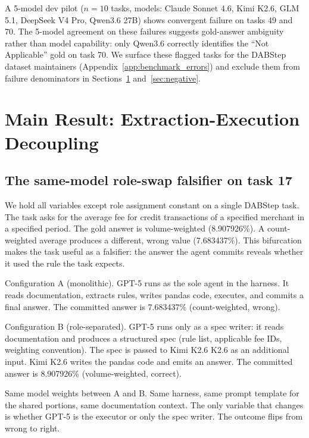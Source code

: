 \documentclass[conference]{IEEEtran}
\newcommand{\Kimi}{Kimi K2.6}
\newcommand{\DeepSeek}{DeepSeek V4 Pro}
\newcommand{\Sonnet}{Claude Sonnet 4.6}
\begin{document}
A 5-model dev pilot ($n=10$ tasks, models: \Sonnet{}, \Kimi{}, GLM 5.1, \DeepSeek{}, Qwen3.6 27B) shows convergent failure on tasks 49 and 70. The 5-model agreement on these failures suggests gold-answer ambiguity rather than model capability: only Qwen3.6 correctly identifies the ``Not Applicable'' gold on task 70. We surface these flagged tasks for the DABStep dataset maintainers (Appendix~\ref{app:benchmark_errors}) and exclude them from failure denominators in Sections~\ref{sec:main} and~\ref{sec:negative}.

\section{Main Result: Extraction-Execution Decoupling}
\label{sec:main}

\subsection{The same-model role-swap falsifier on task 17}
\label{subsec:task17}

We hold all variables except role assignment constant on a single DABStep task. The task asks for the average fee for credit transactions of a specified merchant in a specified period. The gold answer is volume-weighted (8.907926\%). A count-weighted average produces a different, wrong value (7.683437\%). This bifurcation makes the task useful as a falsifier: the answer the agent commits reveals whether it used the rule the task expects.

Configuration A (monolithic). GPT-5 runs as the sole agent in the harness. It reads documentation, extracts rules, writes pandas code, executes, and commits a final answer. The committed answer is 7.683437\% (count-weighted, wrong).

Configuration B (role-separated). GPT-5 runs only as a spec writer: it reads documentation and produces a structured spec (rule list, applicable fee IDs, weighting convention). The spec is passed to \Kimi{} K2.6 as an additional input. \Kimi{} writes the pandas code and emits an answer. The committed answer is 8.907926\% (volume-weighted, correct).

Same model weights between A and B. Same harness, same prompt template for the shared portions, same documentation context. The only variable that changes is whether GPT-5 is the executor or only the spec writer. The outcome flips from wrong to right.
\end{document}
